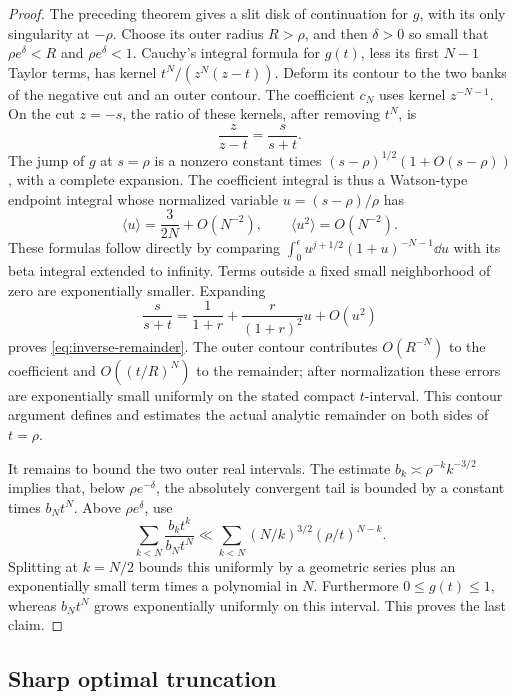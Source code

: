 \begin{proof}
The preceding theorem gives a slit disk of continuation for \(g\),
with its only singularity at \(-\rho\).
Choose its outer radius \(R>\rho\), and then \(\delta>0\) so small that
\(\rho e^\delta<R\) and \(\rho e^\delta<1\).
Cauchy's integral formula for \(g(t)\), less its first \(N-1\)
Taylor terms, has kernel \(t^N/(z^N(z-t))\). Deform its contour to the
two banks of the negative cut and an outer contour.
The coefficient \(c_N\) uses kernel \(z^{-N-1}\).
On the cut \(z=-s\), the ratio of these kernels, after removing
\(t^N\), is
\[
 \frac{z}{z-t}=\frac{s}{s+t}.
\]
The jump of \(g\) at \(s=\rho\) is a nonzero constant times
\((s-\rho)^{1/2}(1+O(s-\rho))\), with a complete expansion.
The coefficient integral is thus a Watson-type endpoint integral
whose normalized variable \(u=(s-\rho)/\rho\) has
\[
 \langle u\rangle=\frac{3}{2N}+O(N^{-2}),
 \qquad \langle u^2\rangle=O(N^{-2}).
\]
These formulas follow directly by comparing
\(\int_0^\epsilon u^{j+1/2}(1+u)^{-N-1}\dd u\)
with its beta integral extended to infinity. Terms outside a fixed
small neighborhood of zero are exponentially smaller.
Expanding
\[
 \frac{s}{s+t}
 =\frac1{1+r}+\frac{r}{(1+r)^2}u+O(u^2)
\]
proves \eqref{eq:inverse-remainder}.
The outer contour contributes \(O(R^{-N})\) to the coefficient and
\(O((t/R)^N)\) to the remainder; after normalization these errors are
exponentially small uniformly on the stated compact \(t\)-interval.
This contour argument defines and estimates the actual analytic
remainder on both sides of \(t=\rho\).

It remains to bound the two outer real intervals.
The estimate \(b_k\asymp\rho^{-k}k^{-3/2}\) implies that, below
\(\rho e^{-\delta}\), the absolutely convergent tail is bounded by
a constant times \(b_Nt^N\). Above \(\rho e^\delta\), use
\[
 \sum_{k<N}\frac{b_kt^k}{b_Nt^N}
 \ll\sum_{k<N}(N/k)^{3/2}(\rho/t)^{N-k}.
\]
Splitting at \(k=N/2\) bounds this uniformly by a geometric series
plus an exponentially small term times a polynomial in \(N\).
Furthermore \(0\leq g(t)\leq1\), whereas \(b_Nt^N\) grows
exponentially uniformly on this interval. This proves the last claim.
\end{proof}

\subsection{Sharp optimal truncation}

